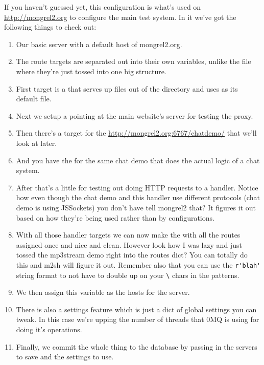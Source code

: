 If you haven't guessed yet, this configuration is what's used on \url{http://mongrel2.org}
to configure the main test system.  In it we've got the following things to check out:

\begin{enumerate}
\item Our basic server with a default host of mongrel2.org.
\item The route targets are separated out into their own variables, unlike the  file
    where they're just tossed into one big structure.
\item First target is a  that serves up files out of the  directory and uses 
    as its default file.
\item Next we setup a  pointing at the main website's server for testing the proxy.
\item Then there's a  target for the \url{http://mongrel2.org:6767/chatdemo/} that we'll look at later.
\item And you have the  for the same chat demo that does the actual logic of a chat system.
\item After that's a little  for testing out doing HTTP requests to a handler.  Notice how even
    though the chat demo and this handler use different protocols (chat demo is using JSSockets) you don't have
    tell mongrel2 that?  It figures it out based on how they're being used rather than by configurations.
\item With all those handler targets we can now make the   with all the routes
    assigned once and nice and clean.  However look how I was lazy and just tossed the mp3stream demo
    right into the routes dict?  You can totally do this and m2sh will figure it out.  Remember also that
    you can use the \verb|r'blah'| string format to not have to double up on your \verb|\| chars in the patterns.
\item We then assign this  variable as the hosts for the  server.
\item There is also a settings feature which is just a dict of global settings you can tweak.  In this case
    we're upping the number of threads that 0MQ is using for doing it's operations.
\item Finally, we commit the whole thing to the database by passing in the servers to save and the settings
    to use.
\end{enumerate}

